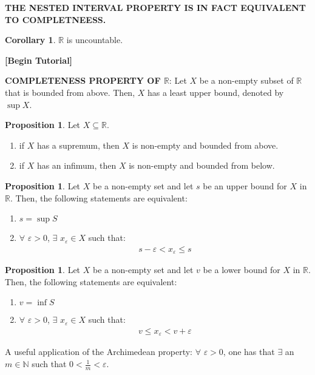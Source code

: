 \documentclass[reqno,11pt]{amsart}
\theoremstyle{definition}
\newtheorem{prop}[theorem]{Proposition}
\newtheorem{corollary}[theorem]{Corollary}
\theoremstyle{definition}
\theoremstyle{remark}
\newcommand{\R}{\mathbb{R}}
\begin{document}
\begin{center}
	\textbf{THE NESTED INTERVAL PROPERTY IS IN FACT EQUIVALENT TO COMPLETNEESS.}
\end{center}

\begin{corollary}
	$\R$ is uncountable.
\end{corollary}

\begin{center}
	\textbf{[Begin Tutorial]}
\end{center}

\textbf{COMPLETENESS PROPERTY OF $\R$}: Let $X$ be a non-empty subset of $\R$ that is bounded from above. Then, $X$ has a least upper bound, denoted by $\sup{X}$. 


\begin{prop}
	Let $X \subseteq \R$. 
	\begin{enumerate}[noitemsep]
		\item if $X$ has a supremum, then $X$ is non-empty and bounded from above. 
		\item if $X$ has an infimum, then $X$ is non-empty and bounded from below.
	\end{enumerate}
\end{prop}


\begin{prop}
	Let $X$ be a non-empty set and let $s$ be an upper bound for $X$ in $\R$. Then, the following statements are equivalent: 
	\begin{enumerate}[noitemsep]
		\item $s = \sup{S}$
		\item $\forall $ $\varepsilon > 0$, $\exists$ $x_\varepsilon \in X$ such that:
		\begin{align}
			s - \varepsilon < x_\varepsilon \leq s	
		\end{align}
	\end{enumerate}
\end{prop}

\begin{prop}
	Let $X$ be a non-empty set and let $v$ be a lower bound for $X$ in $\R$. Then, the following statements are equivalent: 
	\begin{enumerate}[noitemsep]
		\item $v = \inf{S}$
		\item $\forall $ $\varepsilon > 0$, $\exists$ $x_\varepsilon \in X$ such that:
		\begin{align}
			v \leq x_\varepsilon < v + \varepsilon	
		\end{align}
	\end{enumerate}
\end{prop}
A useful application of the Archimedean property: $\forall $ $\varepsilon > 0$, one has that $\exists$ an $m \in \mathbb{N}$ such that $0 < \frac{1}{m} < \varepsilon$. 
\end{document}
